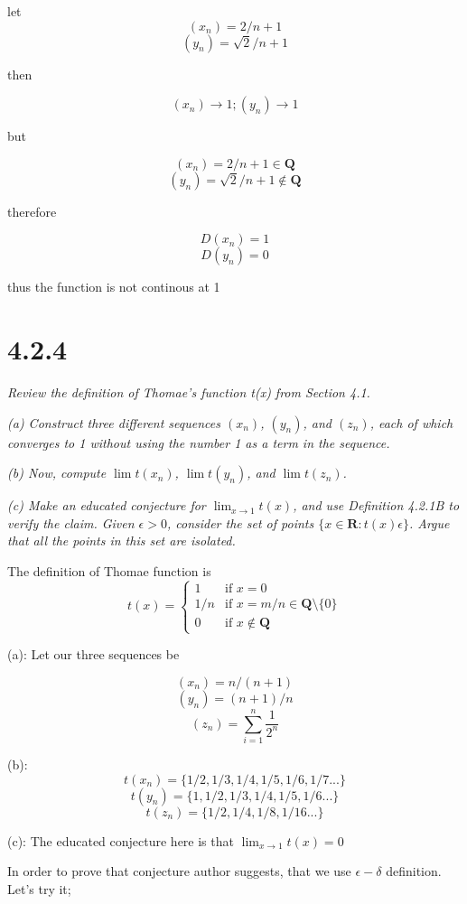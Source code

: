 \documentclass[11pt,oneside,titlepage]{article}
\begin{document}
let
$$(x_n) = 2/n + 1$$
$$(y_n) = \sqrt{2}/n + 1$$

then

$$(x_n) \to 1;(y_n) \to 1$$

but

$$(x_n) = 2/n + 1 \in \textbf{Q}$$
$$(y_n) = \sqrt{2}/n + 1 \notin \textbf{Q}$$

therefore

$$ D(x_n) = 1$$
$$ D(y_n) = 0$$

thus the function is not continous at 1

\section*{4.2.4}
\textit{Review the definition of Thomae’s function t(x) from Section 4.1.}

\textit{(a) Construct three different sequences $(x_n)$, $(y_n)$, and $(z_n)$, each of which converges to 1 without using the number 1 as a term in the sequence.}

\textit{(b) Now, compute $\lim t(x_n)$, $\lim t(y_n)$, and $\lim t(z_n)$.}

\textit{(c) Make an educated conjecture for $\lim_{x\to1} t(x)$, and use Definition 4.2.1B
  to verify the claim. Given $\epsilon > 0$, consider the set of points
$\{x \in \textbf{R} : t(x)  \epsilon\}$.  Argue that all the points in this set are isolated.}


The definition of  Thomae function is
\begin{equation}
t(x)=
    \begin{cases}
      1 & \text{if } x = 0\\
      1/n & \text {if } x = m/n \in \textbf{Q} \text{\textbackslash} \{0\} \\
      0 & \text{if } x \notin \textbf{Q}
    \end{cases}
\end{equation}

(a): Let our three sequences be

$$ (x_n) = n/(n + 1)$$
$$ (y_n) = (n + 1)/n$$
$$ (z_n) = \sum_{i=1}^{n}{\frac{1}{2^n}}$$

(b):
$$t(x_n) = \{1/2, 1/3, 1/4, 1/5, 1/6, 1/7 ...\}$$
$$t(y_n) = \{1, 1/2, 1/3, 1/4, 1/5, 1/6 ...\}$$
$$t(z_n) = \{1/2, 1/4, 1/8, 1/16 ...\}$$

(c): The educated conjecture here is that $\lim_{x \to 1} t(x) = 0$

In order to prove that conjecture author suggests, that we use $\epsilon-\delta$ definition. Let's try
it;
\end{document}
